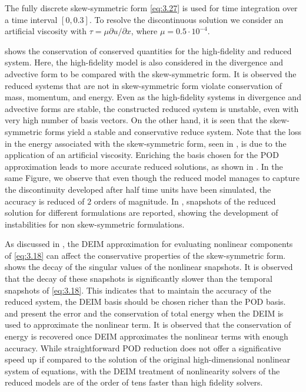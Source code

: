 The fully discrete skew-symmetric form \eqref{eq:3.27} is used for time integration over a time interval $[0,0.3]$. To resolve the discontinuous solution we consider an artificial viscosity with $\tau = \mu \partial u / \partial x$, where $\mu = 0.5 \cdot 10^{-4}$.

 shows the conservation of conserved quantities for the high-fidelity and reduced system. Here, the high-fidelity model is also considered in the divergence and advective form to be compared with the skew-symmetric form. It is observed the reduced systems that are not in skew-symmetric form violate conservation of mass, momentum, and energy. Even as the high-fidelity systems in divergence and advective forms are stable, the constructed reduced system is unstable, even with very high number of basis vectors. On the other hand, it is seen that the skew-symmetric forms yield a stable and conservative reduce system. Note that the loss in the energy associated with the skew-symmetric form, seen in , is due to the application of an artificial viscosity. Enriching the basis chosen for the  POD approximation leads to more accurate reduced solutions, as shown in . In the same Figure, we observe that even though the reduced model manages to capture the discontinuity developed after half time units have been simulated, the accuracy is reduced of 
$2$ orders of magnitude. In , snapshots of the reduced solution for different formulations are reported, showing the development of instabilities for non skew-symmetric formulations.

As discussed in , the DEIM approximation for evaluating nonlinear components of \eqref{eq:3.18} can affect the conservative properties of the skew-symmetric form.  shows the decay of the singular values of the nonlinear snapshots. It is observed that the decay of these snapshots is significantly slower than the temporal snapshots of \eqref{eq:3.18}. This indicates that to maintain the accuracy of the reduced system, the DEIM basis should be chosen richer than the POD basis.  and  present the error and the conservation of total energy when the DEIM is used to approximate the nonlinear term. It is observed that the conservation of energy is recovered once DEIM approximates the nonlinear terms with enough accuracy. While straightforward POD reduction does not offer a significative speed up if compared to the solution of the original high-dimensional nonlinear system of equations, with the DEIM treatment of nonlinearity solvers of the reduced models are of the order of tens faster than high fidelity solvers. 

